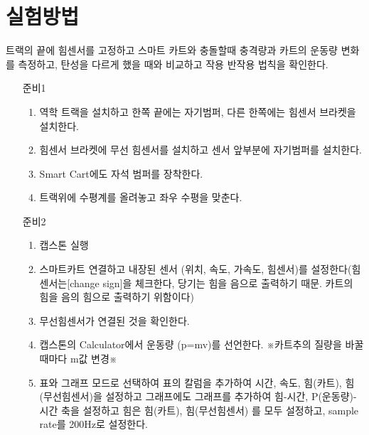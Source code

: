 \documentclass[12pt,a4paper]{article}
\begin{document}
\section{실험방법}
트랙의 끝에 힘센서를 고정하고 스마트 카트와 충돌할때 충격량과 카트의 운동량 변화를
측정하고, 탄성을 다르게 했을 때와 비교하고 작용 반작용 법칙을 확인한다.
\begin{itemize}
    \item [준비1] \begin{enumerate}
            \item 역학 트랙을 설치하고 한쪽 끝에는 자기범퍼, 다른 한쪽에는
                힘센서 브라켓을 설치한다.
            \item 힘센서 브라켓에 무선 힘센서를 설치하고 센서 앞부분에 자기범퍼를
                설치한다.
            \item Smart Cart에도 자석 범퍼를 장착한다.
            \item 트랙위에 수평계를 올려놓고 좌우 수평을 맞춘다.
        \end{enumerate}
    \item [준비2] \begin{enumerate}
            \item 캡스톤 실행
            \item 스마트카트 연결하고 내장된 센서 (위치, 속도, 가속도, 힘센서)를
                설정한다(힘센서는[change sign]을 체크한다, 당기는 힘을 음으로
                출력하기 때문. 카트의 힘을 음의 힘으로 출력하기 위함이다)
            \item 무선힘센서가 연결된 것을 확인한다.
            \item 캡스톤의 Calculator에서 운동량 (p=mv)를 선언한다. ※카트추의
                질량을 바꿀 때마다 m값 변경※
            \item 표와 그래프 모드로 선택하여 표의 칼럼을 추가하여 시간, 속도,
                힘(카트), 힘(무선힘센서)을 설정하고 그래프에도 그래프를 추가하여
                힘-시간, P(운동량)-시간 축을 설정하고 힘은 힘(카트), 힘(무선힘센서)
                를 모두 설정하고, sample rate를 200Hz로 설정한다.
        \end{enumerate}
\end{itemize}
\clearpage
\end{document}
